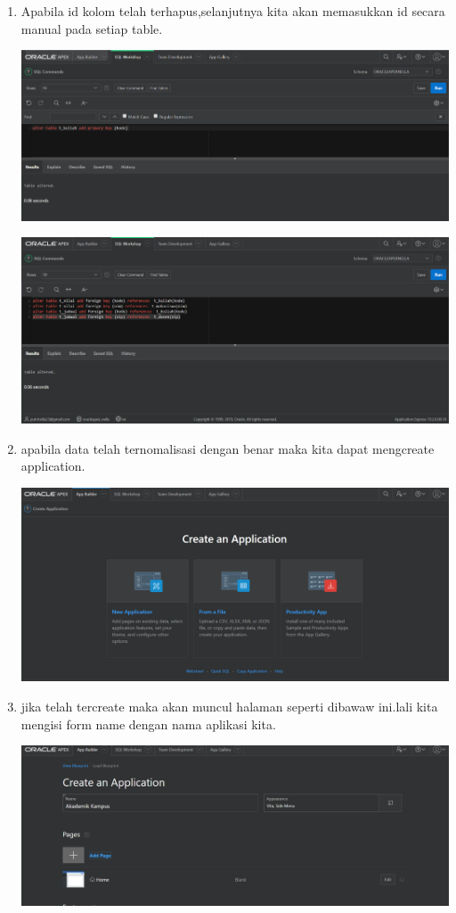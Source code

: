 \documentclass{article}
\begin{document}
\begin{enumerate}
\begin{center}
\end{center}
    \item Apabila id kolom telah terhapus,selanjutnya kita akan memasukkan id secara manual pada setiap table.
    \begin{center}
    \includegraphics[width=.8\textwidth]{figure/17.PNG}
\end{center}
\begin{center}
    \includegraphics[width=.8\textwidth]{figure/25.PNG}
\end{center}
    \item apabila data telah ternomalisasi dengan benar maka kita dapat mengcreate application.
    \begin{center}
    \includegraphics[width=.8\textwidth]{figure/5.PNG}
\end{center}
    \item jika telah tercreate maka akan muncul halaman seperti dibawaw ini.lali kita mengisi form name dengan nama aplikasi kita.
\begin{center}
    \includegraphics[width=.8\textwidth]{figure/26.PNG}

\end{center}
\end{enumerate}
\end{document}
